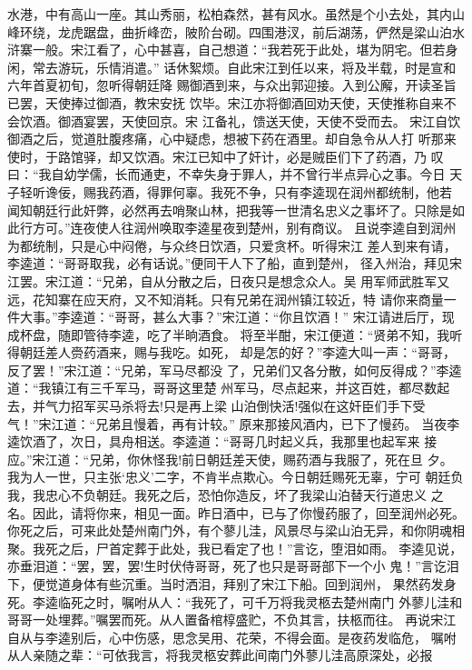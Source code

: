 水港，中有高山一座。其山秀丽，松柏森然，甚有风水。虽然是个小去处，其内山
峰环绕，龙虎踞盘，曲折峰峦，陂阶台砌。四围港汊，前后湖荡，俨然是梁山泊水
浒寨一般。宋江看了，心中甚喜，自己想道：“我若死于此处，堪为阴宅。但若身
闲，常去游玩，乐情消遣。”
话休絮烦。自此宋江到任以来，将及半载，时是宣和六年首夏初旬，忽听得朝廷降
赐御酒到来，与众出郭迎接。入到公廨，开读圣旨已罢，天使捧过御酒，教宋安抚
饮毕。宋江亦将御酒回劝天使，天使推称自来不会饮酒。御酒宴罢，天使回京。宋
江备礼，馈送天使，天使不受而去。
宋江自饮御酒之后，觉道肚腹疼痛，心中疑虑，想被下药在酒里。却自急令从人打
听那来使时，于路馆驿，却又饮酒。宋江已知中了奸计，必是贼臣们下了药酒，乃
叹曰：“我自幼学儒，长而通吏，不幸失身于罪人，并不曾行半点异心之事。今日
天子轻听谗佞，赐我药酒，得罪何辜。我死不争，只有李逵现在润州都统制，他若
闻知朝廷行此奸弊，必然再去哨聚山林，把我等一世清名忠义之事坏了。只除是如
此行方可。”连夜使人往润州唤取李逵星夜到楚州，别有商议。
且说李逵自到润州为都统制，只是心中闷倦，与众终日饮酒，只爱贪杯。听得宋江
差人到来有请，李逵道：“哥哥取我，必有话说。”便同干人下了船，直到楚州，
径入州治，拜见宋江罢。宋江道：“兄弟，自从分散之后，日夜只是想念众人。吴
用军师武胜军又远，花知寨在应天府，又不知消耗。只有兄弟在润州镇江较近，特
请你来商量一件大事。”李逵道：“哥哥，甚么大事？”宋江道：“你且饮酒！”
宋江请进后厅，现成杯盘，随即管待李逵，吃了半晌酒食。
将至半酣，宋江便道：“贤弟不知，我听得朝廷差人赍药酒来，赐与我吃。如死，
却是怎的好？”李逵大叫一声：“哥哥，反了罢！”宋江道：“兄弟，军马尽都没
了，兄弟们又各分散，如何反得成？”李逵道：“我镇江有三千军马，哥哥这里楚
州军马，尽点起来，并这百姓，都尽数起去，并气力招军买马杀将去!只是再上梁
山泊倒快活!强似在这奸臣们手下受气！”宋江道：“兄弟且慢着，再有计较。”
原来那接风酒内，已下了慢药。
当夜李逵饮酒了，次日，具舟相送。李逵道：“哥哥几时起义兵，我那里也起军来
接应。”宋江道：“兄弟，你休怪我!前日朝廷差天使，赐药酒与我服了，死在旦
夕。我为人一世，只主张‘忠义’二字，不肯半点欺心。今日朝廷赐死无辜，宁可
朝廷负我，我忠心不负朝廷。我死之后，恐怕你造反，坏了我梁山泊替天行道忠义
之名。因此，请将你来，相见一面。昨日酒中，已与了你慢药服了，回至润州必死。
你死之后，可来此处楚州南门外，有个蓼儿洼，风景尽与梁山泊无异，和你阴魂相
聚。我死之后，尸首定葬于此处，我已看定了也！”言讫，堕泪如雨。
李逵见说，亦垂泪道：“罢，罢，罢!生时伏侍哥哥，死了也只是哥哥部下一个小
鬼！”言讫泪下，便觉道身体有些沉重。当时洒泪，拜别了宋江下船。回到润州，
果然药发身死。李逵临死之时，嘱咐从人：“我死了，可千万将我灵柩去楚州南门
外蓼儿洼和哥哥一处埋葬。”嘱罢而死。从人置备棺椁盛贮，不负其言，扶柩而往。
再说宋江自从与李逵别后，心中伤感，思念吴用、花荣，不得会面。是夜药发临危，
嘱咐从人亲随之辈：“可依我言，将我灵柩安葬此间南门外蓼儿洼高原深处，必报

